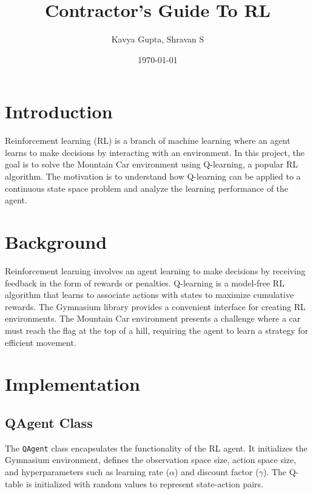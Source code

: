 \documentclass{article}
\title{Contractor's Guide To RL}
\author{Kavya Gupta, Shravan S}
\date{\today}
\begin{document}
\maketitle
\clearpage
\tableofcontents
\clearpage

\section{Introduction}
Reinforcement learning (RL) is a branch of machine learning where an agent learns to make decisions by interacting with an environment. In this project, the goal is to solve the Mountain Car environment using Q-learning, a popular RL algorithm. The motivation is to understand how Q-learning can be applied to a continuous state space problem and analyze the learning performance of the agent.

\section{Background}
Reinforcement learning involves an agent learning to make decisions by receiving feedback in the form of rewards or penalties.
Q-learning is a model-free RL algorithm that learns to associate actions with states to maximize cumulative rewards. The 
Gymnasium library provides a convenient interface for creating RL environments. The Mountain Car environment presents a 
challenge where a car must reach the flag at the top of a hill, requiring the agent to learn a strategy for efficient movement.

\section{Implementation}
\subsection{QAgent Class}
The \texttt{QAgent} class encapsulates the functionality of the RL agent. It initializes the Gymnasium environment, defines 
the observation space size, action space size, and hyperparameters such as learning rate (\(\alpha\)) and discount factor 
(\(\gamma\)). The Q-table is initialized with random values to represent state-action pairs.
\end{document}
